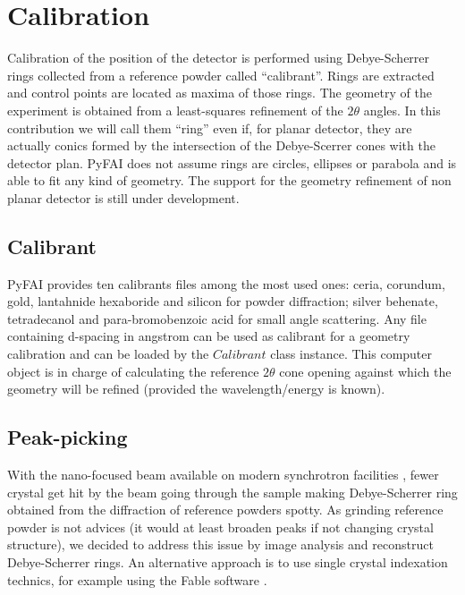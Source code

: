 \documentclass[preprint]{iucr}
\begin{document}
\section{Calibration}
Calibration of the position of the detector is performed using Debye-Scherrer
rings collected from a reference powder called ``calibrant''.
Rings are extracted and control points are located as maxima of those rings.
The geometry of the experiment is obtained from a least-squares refinement of
the $2\theta$ angles.
In this contribution we will call them ``ring'' even if, for planar detector,
they are actually conics formed by the intersection of the Debye-Scerrer cones
with the detector plan. 
PyFAI does not assume rings are circles, ellipses or parabola and is able to fit
any kind of geometry. The support for the geometry refinement of non planar
detector is still under development.

\subsection{Calibrant}
PyFAI provides ten calibrants files among the most used ones: ceria, corundum,
gold, lantahnide hexaboride and silicon for powder diffraction; silver behenate,
tetradecanol and para-bromobenzoic acid for small angle scattering.
Any file containing d-spacing in angstrom can be used as calibrant for a
geometry calibration and can be loaded by the $Calibrant$ class instance.
This computer object is in charge of
calculating the reference $2\theta$ cone opening 
against which the geometry will be refined (provided the wavelength/energy is
known).

\subsection{Peak-picking}
With the nano-focused beam available on modern synchrotron facilities
\cite{id13}, fewer crystal get hit by the beam going through the
sample making Debye-Scherrer ring obtained from the diffraction of reference
powders spotty.
As grinding reference powder is not advices (it would at least broaden peaks if
not changing crystal structure), we decided to address this issue by image analysis 
and reconstruct Debye-Scherrer rings.
An alternative approach is to use single crystal indexation technics, for
example using the Fable software \cite{bonnin}.
\end{document}
